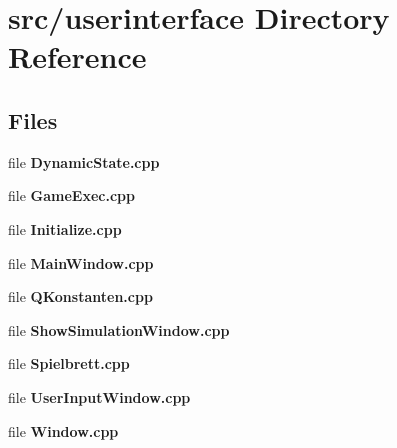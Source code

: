 \section{src/userinterface Directory Reference}
\label{dir_6a9bbfda24ff156040a5bbe170f94215}
\subsection*{Files}
\begin{DoxyCompactItemize}
\item 
file {\bfseries Dynamic\-State.\-cpp}
\item 
file {\bfseries Game\-Exec.\-cpp}
\item 
file {\bfseries Initialize.\-cpp}
\item 
file {\bfseries Main\-Window.\-cpp}
\item 
file {\bfseries Q\-Konstanten.\-cpp}
\item 
file {\bfseries Show\-Simulation\-Window.\-cpp}
\item 
file {\bfseries Spielbrett.\-cpp}
\item 
file {\bfseries User\-Input\-Window.\-cpp}
\item 
file {\bfseries Window.\-cpp}
\end{DoxyCompactItemize}
